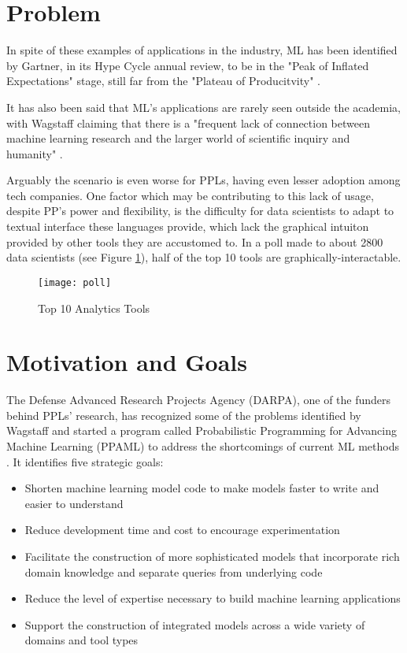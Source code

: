 \section{Problem} \label{sec:proj}

In spite of these examples of applications in the industry, ML has been
identified by Gartner, in its Hype Cycle annual review,
to be in the "Peak of Inflated Expectations" stage, still far
from the "Plateau of Producitvity" \cite{gartner}.

It has also been said that ML's applications are rarely seen
outside the academia, with Wagstaff claiming that there is a "frequent lack of
connection between machine learning research and the larger world of scientific
inquiry and humanity" \cite{Wagstaff2012}.

Arguably the scenario is even worse for PPLs, having even lesser adoption
among tech companies. One factor which may be contributing to this lack of
usage, despite PP's power and flexibility, is the difficulty for data scientists
to adapt to textual interface these languages provide, which lack the graphical
intuiton provided by other tools they are accustomed to. In a poll made to about 2800
data scientists (see Figure \ref{fig:poll}), half of the top 10 tools are
graphically-interactable.

\begin{figure}[t]
  \begin{center}
    \leavevmode
    \texttt{[image: poll]}
    \caption{Top 10 Analytics Tools \cite{kdn}}
    \label{fig:poll}
  \end{center}
\end{figure}

\section{Motivation and Goals} \label{sec:goals}

The Defense Advanced Research Projects Agency (DARPA), one of the funders behind PPLs' research, has recognized some of the problems
identified by Wagstaff and started a program called Probabilistic Programming
for Advancing Machine Learning (PPAML) to address the shortcomings of
current ML methods \cite{darpa}. It identifies five strategic goals:

\begin{itemize}
  \item Shorten machine learning model code to make models faster to write and
  easier to understand
  \item Reduce development time and cost to encourage experimentation
  \item Facilitate the construction of more sophisticated models that
  incorporate rich domain knowledge and separate queries from underlying code
  \item Reduce the level of expertise necessary to build machine learning
  applications
  \item Support the construction of integrated models across a wide variety of
  domains and tool types
\end{itemize}

